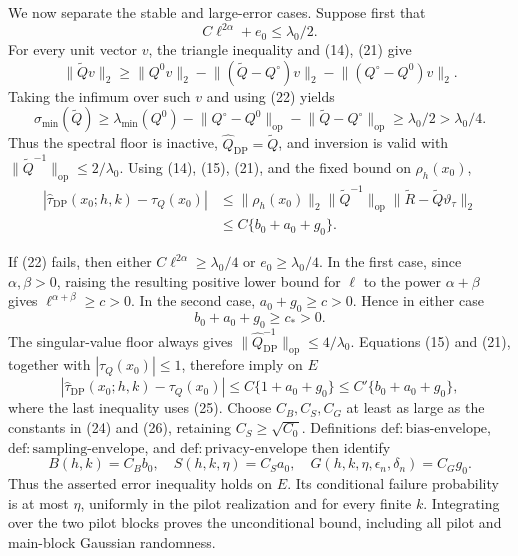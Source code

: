 We now separate the stable and large-error cases.  Suppose first that
\[
 C\ell^{2\alpha}+e_0\le\lambda_0/2.                           \tag{22}
\]
For every unit vector \(v\), the triangle inequality and (14), (21) give
\[
 \lVert\widetilde Qv\rVert_2
 \ge \lVert Q^0v\rVert_2
      -\lVert(\widetilde Q-Q^\circ)v\rVert_2
      -\lVert(Q^\circ-Q^0)v\rVert_2.
\]
Taking the infimum over such \(v\) and using (22) yields
\[
 \sigma_{\min}(\widetilde Q)
 \ge\lambda_{\min}(Q^0)-\lVert Q^\circ-Q^0\rVert_{\mathrm{op}}
     -\lVert\widetilde Q-Q^\circ\rVert_{\mathrm{op}}
 \ge\lambda_0/2>\lambda_0/4.                                \tag{23}
\]
Thus the spectral floor is inactive, \(\widehat Q_{\mathrm{DP}}=\widetilde Q\), and inversion is valid with
\(\lVert\widetilde Q^{-1}\rVert_{\mathrm{op}}\le2/\lambda_0\).  Using (14), (15), (21), and the fixed bound on \(\rho_h(x_0)\),
\[
 \begin{aligned}
 \left|\widehat\tau_{\mathrm{DP}}(x_0;h,k)-\tau_Q(x_0)\right|
 &\le \lVert\rho_h(x_0)\rVert_2\lVert\widetilde Q^{-1}\rVert_{\mathrm{op}}
       \lVert\widetilde R-\widetilde Q\vartheta_\tau\rVert_2\\
 &\le C\{b_0+a_0+g_0\}.
 \end{aligned}                                                \tag{24}
\]

If (22) fails, then either \(C\ell^{2\alpha}\ge\lambda_0/4\) or \(e_0\ge\lambda_0/4\).  In the first case, since \(\alpha,\beta>0\), raising the resulting positive lower bound for \(\ell\) to the power \(\alpha+\beta\) gives \(\ell^{\alpha+\beta}\ge c>0\).  In the second case, \(a_0+g_0\ge c>0\).  Hence in either case
\[
 b_0+a_0+g_0\ge c_*>0.                                      \tag{25}
\]
The singular-value floor always gives
\(\lVert\widehat Q_{\mathrm{DP}}^{-1}\rVert_{\mathrm{op}}\le4/\lambda_0\).  Equations (15) and (21), together with \(|\tau_Q(x_0)|\le1\), therefore imply on \(E\)
\[
 \left|\widehat\tau_{\mathrm{DP}}(x_0;h,k)-\tau_Q(x_0)\right|
 \le C\{1+a_0+g_0\}
 \le C'\{b_0+a_0+g_0\},                                    \tag{26}
\]
where the last inequality uses (25).  Choose \(C_B,C_S,C_G\) at least as large as the constants in (24) and (26), retaining \(C_S\ge\sqrt{C_0}\).  Definitions \(\mathrm{def{:}bias\text{-}envelope}\), \(\mathrm{def{:}sampling\text{-}envelope}\), and \(\mathrm{def{:}privacy\text{-}envelope}\) then identify
\[
 B(h,k)=C_Bb_0,\quad S(h,k,\eta)=C_Sa_0,\quad
 G(h,k,\eta,\epsilon_n,\delta_n)=C_Gg_0.
\]
Thus the asserted error inequality holds on \(E\).  Its conditional failure probability is at most \(\eta\), uniformly in the pilot realization and for every finite \(k\).  Integrating over the two pilot blocks proves the unconditional bound, including all pilot and main-block Gaussian randomness.

